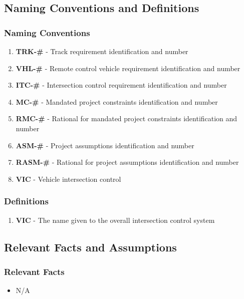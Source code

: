 \documentclass [12pt]{article}
\begin{document}
\subsection{Naming Conventions and Definitions}
\subsubsection{Naming Conventions}
\begin{enumerate}
	\itemsep0pt 
 	\item \textbf{TRK-\#} - Track requirement identification  and number
	\item \textbf{VHL-\#} - Remote control vehicle requirement identification  and number				\item \textbf{ITC-\#} - Intersection control requirement identification  and number
	\item \textbf{MC-\#} - Mandated project constraints identification and number 
	\item \textbf{RMC-\#} - Rational for mandated project constraints identification and number
	\item \textbf{ASM-\#} - Project assumptions identification and number
	\item \textbf{RASM-\#} - Rational for project assumptions identification and number
	\item \textbf{VIC} - Vehicle intersection control
\end{enumerate}

\subsubsection{Definitions}
\begin{enumerate}
	\itemsep0pt
	\item \textbf{VIC} - The name given to the overall intersection control system
\end{enumerate}

	
\subsection{Relevant Facts and Assumptions} 

\subsubsection{Relevant Facts}
\begin{itemize}
	\item N/A
\end{itemize}
\end{document}
